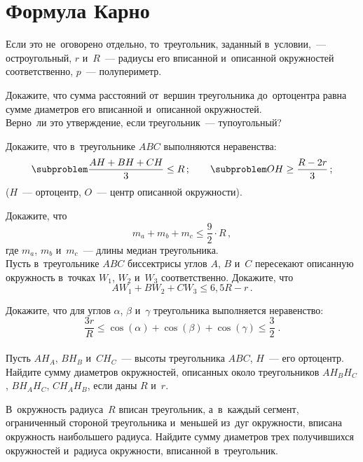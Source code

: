 
\section*{Формула Карно}


Если это не~оговорено отдельно, то~треугольник, заданный в~условии,~—
остроугольный, $r$ и~$R$~— радиусы его вписанной и~описанной окружностей
соответственно, $p$~— полупериметр.

\begin{problems}

\item
\subproblem
Докажите, что сумма расстояний от~вершин треугольника до~ортоцентра равна сумме
диаметров его вписанной и~описанной окружностей.
\\
\subproblem
Верно~ли это утверждение, если треугольник~— тупоугольный?

\item
Докажите, что в~треугольнике $ABC$ выполняются неравенства:
\[
\text{\subproblem}
    \frac{AH + BH + CH}{3} \leq R
\, ; \qquad
\text{\subproblem}
    OH \geq \frac{R - 2 r}{3}
\, ; \]
($H$~— ортоцентр, $O$~— центр описанной окружности).

\item
\subproblem
Докажите, что
\[
    m_a + m_b + m_c
\leq
    \frac{9}{2} \cdot R
\, , \]
где $m_a$, $m_b$ и~$m_c$~— длины медиан треугольника.
\\
\subproblem
Пусть в~треугольнике $ABC$ биссектрисы углов $A$, $B$ и~$C$ пересекают
описанную окружность в~точках $W_1$, $W_2$ и~$W_3$ соответственно.
Докажите, что
\[
    A W_1 + B W_2 + C W_3
\leq
    6{,}5 R - r
\, . \]

\item
\subproblem
Докажите, что для углов $\alpha$, $\beta$ и~$\gamma$ треугольника выполняется
неравенство:
\[
    \frac{3 r}{R}
\leq
    \cos(\alpha) + \cos(\beta) + \cos(\gamma)
\leq
    \frac{3}{2}
\; . \]
\\
\subproblem
Пусть $A H_A$, $B H_B$ и~$C H_C$~— высоты треугольника $ABC$, $H$~—
его ортоцентр.
Найдите сумму диаметров окружностей, описанных около треугольников
$A H_B H_C$, $B H_A H_C$, $C H_A H_B$, если даны $R$ и~$r$.

\item
В~окружность радиуса~$R$ вписан треугольник, а~в~каждый сегмент, ограниченный
стороной треугольника и~меньшей из~дуг окружности, вписана окружность
наибольшего радиуса.
Найдите сумму диаметров трех получившихся окружностей и~радиуса окружности,
вписанной в~треугольник.


\end{problems}
